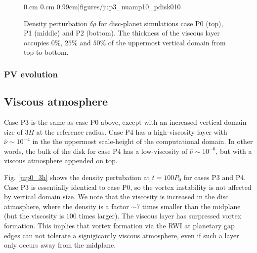 \begin{figure}
     0.cm 0.cm
     0.99cm]{figures/jup3_nuamp10_pdisk010}\\%
   \caption{Density perturbation $\delta\rho$ for disc-planet
     simulations case P0 (top), P1 (middle) and P2 (bottom). The
     thickness of the viscous layer occupies $0\%,\,25\%$ and $50\%$
     of the uppermost vertical domain from top to bottom. 
   \label{jup0}}
 \end{figure}


\subsubsection{PV evolution}





\subsection{Viscous atmosphere}
Case P3 is the same as case P0 above, except with an increased
vertical domain size of $3H$ at the reference radius. Case P4 has a high-viscosity layer with
$\hat{\nu}\sim10^{-4}$ in the the uppermost scale-height of the
computational domain. In other words, the bulk of the 
disk for case P4 has a low-viscosity of $\hat{\nu}\sim10^{-6}$, but
with a viscous atmosphere appended on top.  

Fig. \ref{jup0_3h} shows the density pertubation at $t=100P_0$ for
cases P3 and P4. Case P3 is essentially identical to case P0, so the
vortex instability is not affected by vertical domain size. We note
that the viscosity is increased in the disc atmosphere, where the
density is a factor $\sim 7$ times smaller than the midplane (but the
viscosity is $100$ times larger). The viscous layer has surpressed
vortex formation. This implies that vortex formation via
the RWI at planetary gap edges can not tolerate a signigicantly
viscous atmosphere, even if such a layer only occurs away from the
midplane.    

